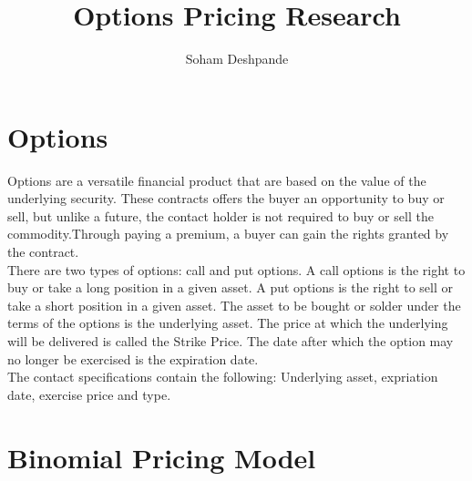 \documentclass[12pt]{article}
\begin{document}
\title{Options Pricing Research }
\author{Soham Deshpande}
\maketitle
\clearpage
\tableofcontents
\clearpage

\section{Options}
Options are a versatile financial product that are based on the value of the 
underlying security. These contracts offers the buyer an opportunity to buy or
sell, but unlike a future, the contact holder is not required to buy or sell the 
commodity.Through paying a premium, a buyer can gain the rights granted by the
contract.
\\
There are two types of options: call and put options. A call options is the
right to buy
or take a long position in a given asset. A put options is the right to sell or
take a short position in a given asset. The asset to be bought or solder under
the terms of the options is the underlying asset. The price at which the
underlying will be delivered is called the Strike Price. The date after which the
option may no longer be exercised is the expiration date.
\\
The contact specifications contain the following: Underlying asset, expriation
date, exercise price and type. 
 
\section{Binomial Pricing Model}
\end{document}
